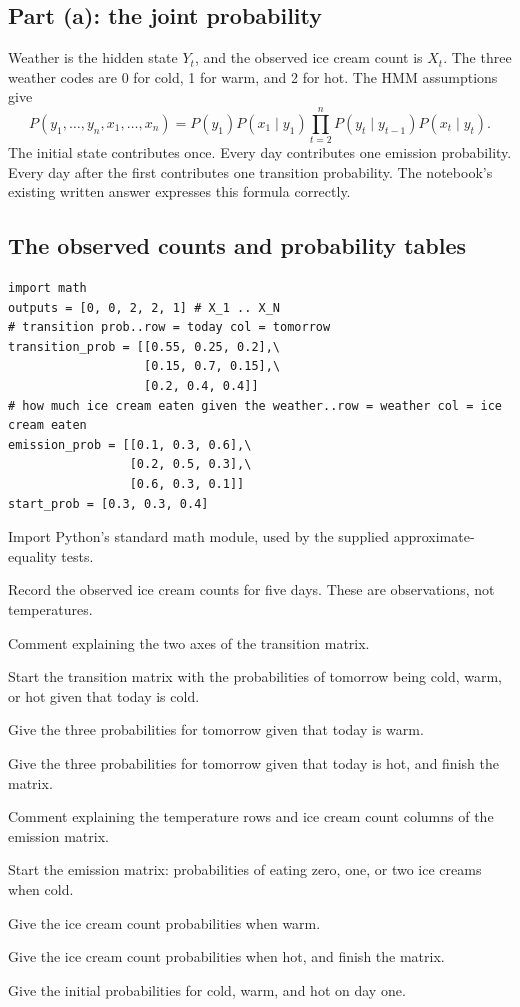 \documentclass[11pt,a4paper]{article}
\begin{document}
\subsection{Part (a): the joint probability}
Weather is the hidden state \(Y_t\), and the observed ice cream count is \(X_t\).
The three weather codes are 0 for cold, 1 for warm, and 2 for hot.
The HMM assumptions give
\[
P(y_1,\ldots,y_n,x_1,\ldots,x_n)
=P(y_1)P(x_1\mid y_1)
\prod_{t=2}^{n}P(y_t\mid y_{t-1})P(x_t\mid y_t).
\]
The initial state contributes once. Every day contributes one emission probability.
Every day after the first contributes one transition probability. The notebook's
existing written answer expresses this formula correctly.
\subsection{The observed counts and probability tables}
\begin{lstlisting}
import math
outputs = [0, 0, 2, 2, 1] # X_1 .. X_N
# transition prob..row = today col = tomorrow
transition_prob = [[0.55, 0.25, 0.2],\
                   [0.15, 0.7, 0.15],\
                   [0.2, 0.4, 0.4]]
# how much ice cream eaten given the weather..row = weather col = ice cream eaten
emission_prob = [[0.1, 0.3, 0.6],\
                 [0.2, 0.5, 0.3],\
                 [0.6, 0.3, 0.1]]
start_prob = [0.3, 0.3, 0.4]
\end{lstlisting}
\begin{description}[style=nextline,leftmargin=19mm,font=\normalfont\bfseries]
\item[Line 1.] Import Python's standard math module, used by the supplied approximate-equality tests.
\item[Line 2.] Record the observed ice cream counts for five days. These are observations, not temperatures.
\item[Line 3.] Comment explaining the two axes of the transition matrix.
\item[Line 4.] Start the transition matrix with the probabilities of tomorrow being cold, warm, or hot given that today is cold.
\item[Line 5.] Give the three probabilities for tomorrow given that today is warm.
\item[Line 6.] Give the three probabilities for tomorrow given that today is hot, and finish the matrix.
\item[Line 7.] Comment explaining the temperature rows and ice cream count columns of the emission matrix.
\item[Line 8.] Start the emission matrix: probabilities of eating zero, one, or two ice creams when cold.
\item[Line 9.] Give the ice cream count probabilities when warm.
\item[Line 10.] Give the ice cream count probabilities when hot, and finish the matrix.
\item[Line 11.] Give the initial probabilities for cold, warm, and hot on day one.
\end{description}
\end{document}
